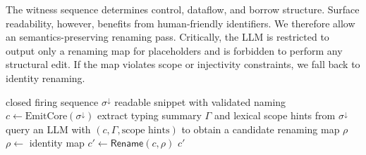 \documentclass[sigconf]{acmart}
\newtheorem{definition}{Definition}
\begin{document}
The witness sequence determines control, dataflow, and borrow structure. Surface readability, however, benefits from human-friendly identifiers. We therefore allow an semantics-preserving renaming pass. Critically, the LLM is restricted to output only a renaming map for placeholders and is forbidden to perform any structural edit. If the map violates scope or injectivity constraints, we fall back to identity renaming.

\begin{algorithm}[t]
\caption{$\mathsf{LLMNameFill}(\sigma^{\downarrow})$}
\label{alg:llm-name}
\begin{algorithmic}[1]
\REQUIRE closed firing sequence $\sigma^{\downarrow}$
\ENSURE readable snippet with validated naming
\STATE $c\gets \mathrm{EmitCore}(\sigma^{\downarrow})$
\STATE extract typing summary $\Gamma$ and lexical scope hints from $\sigma^{\downarrow}$
\STATE query an LLM with $(c,\Gamma,\text{scope hints})$ to obtain a candidate renaming map $\rho$
   \STATE $\rho\gets$ identity map
\ENDIF
\STATE $c'\gets \mathsf{Rename}(c,\rho)$
\RETURN $c'$
\end{algorithmic}
\end{algorithm}




\end{document}
